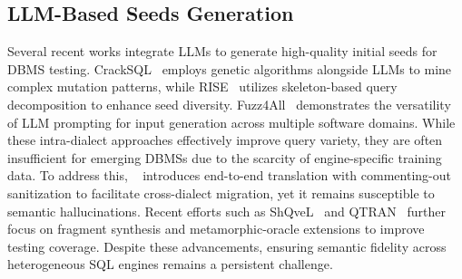 \documentclass[sigconf,review,anonymous]{acmart}
\begin{document}
\subsection{LLM-Based Seeds Generation}
Several recent works integrate LLMs to generate high-quality initial seeds for DBMS testing. CrackSQL~\cite{zhou2025cracking} employs genetic algorithms alongside LLMs to mine complex mutation patterns, while RISE~\cite{xie2026rise} utilizes skeleton-based query decomposition to enhance seed diversity. Fuzz4All~\cite{xia2024fuzz4all} demonstrates the versatility of LLM prompting for input generation across multiple software domains. While these intra-dialect approaches effectively improve query variety, they are often insufficient for emerging DBMSs due to the scarcity of engine-specific training data. To address this, \sedar{}~\cite{fu2024sedar} introduces end-to-end translation with commenting-out sanitization to facilitate cross-dialect migration, yet it remains susceptible to semantic hallucinations. Recent efforts such as ShQveL~\cite{zhong2025testing} and QTRAN~\cite{lin2025qtran} further focus on fragment synthesis and metamorphic-oracle extensions to improve testing coverage. Despite these advancements, ensuring semantic fidelity across heterogeneous SQL engines remains a persistent challenge.

\end{document}
